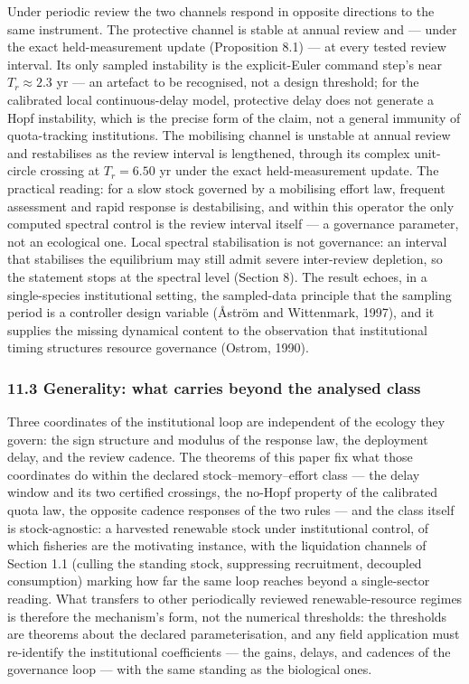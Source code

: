 \documentclass[11pt]{article}
\begin{document}
Under periodic review the two channels respond in opposite directions to
the same instrument. The protective channel is stable at annual review
and --- under the exact held-measurement update (Proposition 8.1) --- at
every tested review interval. Its only sampled instability is the
explicit-Euler command step's near \(T_r \approx 2.3\) yr --- an
artefact to be recognised, not a design threshold; for the calibrated
local continuous-delay model, protective delay does not generate a Hopf
instability, which is the precise form of the claim, not a general
immunity of quota-tracking institutions. The mobilising channel is
unstable at annual review and restabilises as the review interval is
lengthened, through its complex unit-circle crossing at \(T_r = 6.50\)
yr under the exact held-measurement update. The practical reading: for a
slow stock governed by a mobilising effort law, frequent assessment and
rapid response is destabilising, and within this operator the only
computed spectral control is the review interval itself --- a governance
parameter, not an ecological one. Local spectral stabilisation is not
governance: an interval that stabilises the equilibrium may still admit
severe inter-review depletion, so the statement stops at the spectral
level (Section 8). The result echoes, in a single-species institutional
setting, the sampled-data principle that the sampling period is a
controller design variable (\AA{}str\"om and Wittenmark, 1997), and it
supplies the missing dynamical content to the observation that
institutional timing structures resource governance (Ostrom, 1990).

\subsubsection{11.3 Generality: what carries beyond the analysed
class}\label{generality-what-carries-beyond-the-analysed-class}

Three coordinates of the institutional loop are independent of the
ecology they govern: the sign structure and modulus of the response law,
the deployment delay, and the review cadence. The theorems of this paper
fix what those coordinates do within the declared stock--memory--effort
class --- the delay window and its two certified crossings, the no-Hopf
property of the calibrated quota law, the opposite cadence responses of
the two rules --- and the class itself is stock-agnostic: a harvested
renewable stock under institutional control, of which fisheries are the
motivating instance, with the liquidation channels of Section 1.1
(culling the standing stock, suppressing recruitment, decoupled
consumption) marking how far the same loop reaches beyond a
single-sector reading. What transfers to other periodically reviewed
renewable-resource regimes is therefore the mechanism's form, not the
numerical thresholds: the thresholds are theorems about the declared
parameterisation, and any field application must re-identify the
institutional coefficients --- the gains, delays, and cadences of the
governance loop --- with the same standing as the biological ones.
\end{document}
